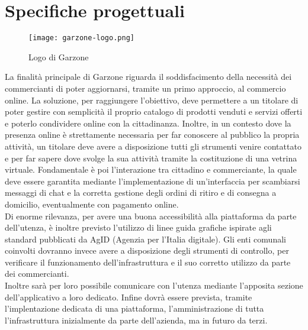 \section{Specifiche progettuali}
\begin{figure}[!htb]
    \centering
    \texttt{[image: garzone-logo.png]}
    \caption{Logo di Garzone}
\end{figure}
La finalità principale di Garzone riguarda il soddisfacimento della necessità dei commercianti di poter aggiornarsi, tramite un primo approccio, al commercio online. La soluzione, per raggiungere l'obiettivo, deve permettere a un titolare di poter gestire con semplicità il proprio catalogo di prodotti venduti e servizi offerti e poterlo condividere online con la cittadinanza. Inoltre, in un contesto dove la presenza online è strettamente necessaria per far conoscere al pubblico la propria attività, un titolare deve avere a disposizione tutti gli strumenti venire contattato e per far sapere dove svolge la sua attività tramite la costituzione di una vetrina virtuale. Fondamentale è poi l'interazione tra cittadino e commerciante, la quale deve essere garantita mediante l'implementazione di un'interfaccia per scambiarsi messaggi di chat e la corretta gestione degli ordini di ritiro e di consegna a domicilio, eventualmente con pagamento online. \\Di enorme rilevanza, per avere una buona accessibilità alla piattaforma da parte dell'utenza, è inoltre previsto l'utilizzo di linee guida grafiche ispirate agli standard pubblicati da AgID (Agenzia per l'Italia digitale)\cite{AGID}. Gli enti comunali coinvolti dovranno invece avere a disposizione degli strumenti di controllo, per verificare il funzionamento dell'infrastruttura e il suo corretto utilizzo da parte dei commercianti. \\Inoltre sarà per loro possibile comunicare con l'utenza mediante l'apposita sezione dell'applicativo a loro dedicato. Infine dovrà essere prevista, tramite l'implentazione dedicata di una piattaforma, l'amministrazione di tutta l'infrastruttura inizialmente da parte dell'azienda, ma in futuro da terzi. 
